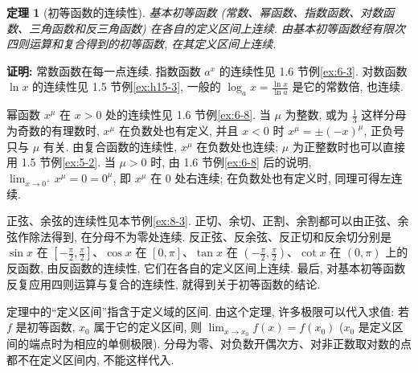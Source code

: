 \documentclass[UTF8,openany]{ctexbook}
\theoremstyle{chinesetextbook}
\newtheorem{theorem}{定理}[section]
\newenvironment{cnproof}{\par\indent\textbf{证明:} \ignorespaces}{\par}
\begin{document}
\begin{theorem}[初等函数的连续性]
基本初等函数 (常数、幂函数、指数函数、对数函数、三角函数和反三角函数) 在各自的定义区间上连续. 由基本初等函数经有限次四则运算和复合得到的初等函数, 在其定义区间上连续.
\end{theorem}
\begin{cnproof}
常数函数在每一点连续. 指数函数 $a^x$ 的连续性见 1.6 节例\ref{ex:6-3}. 对数函数 $\ln x$ 的连续性见 1.5 节例\ref{ex:h15-3}, 一般的 $\displaystyle\log_ax=\frac{\ln x}{\ln a}$ 是它的常数倍, 也连续.

幂函数 $x^\mu$ 在 $x>0$ 处的连续性见 1.6 节例\ref{ex:6-8}. 当 $\mu$ 为整数, 或为 $\displaystyle\frac13$ 这样分母为奇数的有理数时, $x^\mu$ 在负数处也有定义, 并且 $x<0$ 时 $x^\mu=\pm(-x)^\mu$, 正负号只与 $\mu$ 有关. 由复合函数的连续性, $x^\mu$ 在负数处也连续; $\mu$ 为正整数时也可以直接用 1.5 节例\ref{ex:5-2}. 当 $\mu>0$ 时, 由 1.6 节例\ref{ex:6-8} 后的说明, $\displaystyle\lim_{x\to0^+}x^\mu=0=0^\mu$, 即 $x^\mu$ 在 $0$ 处右连续; 在负数处也有定义时, 同理可得左连续.

正弦、余弦的连续性见本节例\ref{ex:8-3}. 正切、余切、正割、余割都可以由正弦、余弦作除法得到, 在分母不为零处连续. 反正弦、反余弦、反正切和反余切分别是 $\sin x$ 在 $\displaystyle\left[-\frac\pi2,\frac\pi2\right]$、$\cos x$ 在 $[0,\pi]$、$\tan x$ 在 $\displaystyle\left(-\frac\pi2,\frac\pi2\right)$、$\cot x$ 在 $(0,\pi)$ 上的反函数, 由反函数的连续性, 它们在各自的定义区间上连续. 最后, 对基本初等函数反复应用四则运算与复合的连续性, 就得到关于初等函数的结论.
\end{cnproof}
定理中的“定义区间”指含于定义域的区间. 由这个定理, 许多极限可以代入求值: 若 $f$ 是初等函数, $x_0$ 属于它的定义区间, 则 $\displaystyle\lim_{x\to x_0}f(x)=f(x_0)$ ($x_0$ 是定义区间的端点时为相应的单侧极限). 分母为零、对负数开偶次方、对非正数取对数的点都不在定义区间内, 不能这样代入.
\end{document}

